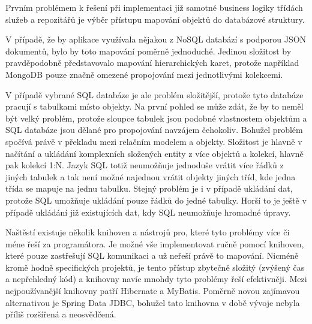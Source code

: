 		Prvním problémem k řešení při implementaci již samotné business logiky třídách služeb a repozitářů je výběr
		přístupu mapování objektů do databázové struktury.

		V případě, že by aplikace využívala nějakou z \ac{NoSQL} databází s podporou \ac{JSON} dokumentů, bylo by toto
		mapování poměrně jednoduché.
		Jedinou složitost by pravděpodobně představovalo mapování hierarchických karet, protože například MongoDB pouze
		značně omezené propojování mezi jednotlivými kolekcemi.

		V případě vybrané \ac{SQL} databáze je ale problém složitější, protože tyto databáze pracují s tabulkami místo objekty.
		Na první pohled se může zdát, že by to neměl být velký problém, protože sloupce tabulek jsou podobné vlastnostem
		objektům a \ac{SQL} databáze jsou dělané pro propojování navzájem čehokoliv.
		Bohužel problém spočívá právě v překladu mezi relačním modelem a objekty.
		Složitost je hlavně v načítání a ukládání komplexních složených entity z více objektů a kolekcí, hlavně pak
		kolekcí 1:N.
		Jazyk \ac{SQL} totiž neumožňuje jednoduše vrátit více řádků z jiných tabulek a tak není možné najednou
		vrátit objekty jiných tříd, kde jedna třída se mapuje na jednu tabulku.
		Stejný problém je i v případě ukládání dat, protože \ac{SQL} umožňuje ukládání pouze řádků do jedné tabulky.
		Horší to je ještě v případě ukládání již existujících dat, kdy \ac{SQL} neumožňuje hromadné úpravy.

		Naštěstí existuje několik knihoven a nástrojů pro, které tyto problémy více či méne řeší za programátora.
		Je možné vše implementovat ručně pomocí knihoven, které pouze zastřešují \ac{SQL} komunikaci a už neřeší
		právě to mapování.
		Nicméně kromě hodně specifických projektů, je tento přístup zbytečně složitý (zvýšený čas a nepřehledný kód)
		a knihovny navíc mnohdy tyto problémy řeší efektivněji.
		Mezi nejpoužívanější knihovny patří Hibernate a MyBatis.
		Poměrně novou zajímavou alternativou je Spring Data JDBC, bohužel tato knihovna v době vývoje nebyla příliš
		rozšířená a neosvědčená.

